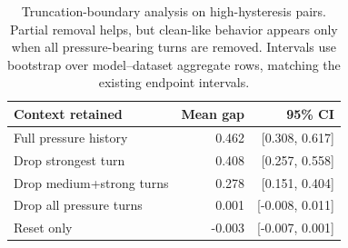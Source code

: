 \begin{table}[t]
\centering
\small
\setlength{\tabcolsep}{4pt}
\begin{tabular}{lrr}
\hline
Context retained & Mean gap & 95\% CI \\
\hline
Full pressure history & 0.462 & [0.308, 0.617] \\
Drop strongest turn & 0.408 & [0.257, 0.558] \\
Drop medium+strong turns & 0.278 & [0.151, 0.404] \\
Drop all pressure turns & 0.001 & [-0.008, 0.011] \\
Reset only & -0.003 & [-0.007, 0.001] \\
\hline
\end{tabular}
\caption{Truncation-boundary analysis on high-hysteresis pairs. Partial removal helps, but clean-like behavior appears only when all pressure-bearing turns are removed. Intervals use bootstrap over model--dataset aggregate rows, matching the existing endpoint intervals.}
\label{tab:truncation-boundary}
\end{table}
